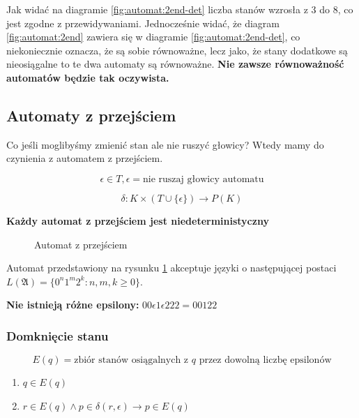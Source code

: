 \documentclass{../notatki}
\begin{document}
Jak widać na diagramie \ref{fig:automat:2end-det} liczba stanów
wzrosła z 3 do 8, co jest zgodne z przewidywaniami.
Jednocześnie widać, że diagram \ref{fig:automat:2end} zawiera się w
diagramie \ref{fig:automat:2end-det}, co niekoniecznie oznacza, że są
sobie równoważne, lecz jako, że stany dodatkowe są nieosiągalne to te
dwa automaty są równoważne.
\textbf{Nie zawsze równoważność automatów będzie tak oczywista.}

\subsection{Automaty z przejściem}

Co jeśli moglibyśmy zmienić stan ale nie ruszyć głowicy? Wtedy mamy
do czynienia z automatem z przejściem.

$$
\epsilon \in T, \epsilon = \text{nie ruszaj głowicy automatu}
$$

$$
\delta: K \times (T \cup \{\epsilon\}) \rightarrow P(K)
$$

\textbf{Każdy automat z przejściem jest niedeterministyczny}

\begin{figure}[H]
  \centering
  \caption{Automat z przejściem}
  \label{fig:automat:epsilon}
\end{figure}
Automat przedstawiony na rysunku \ref{fig:automat:epsilon} akceptuje
języki o następującej postaci $L(\mathfrak{A})=\{0^n1^m2^k: n,m,k \ge 0\}$.

\textbf{Nie istnieją różne epsilony:} $00\epsilon1\epsilon222 = 00122$

\subsubsection{Domknięcie stanu}

$$
E(q) = \text{zbiór stanów osiągalnych z } q \text{ przez dowolną
liczbę epsilonów}
$$

\begin{enumerate}
  \item $q \in E(q)$
  \item $r \in E(q) \wedge p \in \delta(r, \epsilon) \rightarrow p \in E(q)$
\end{enumerate}
\end{document}

